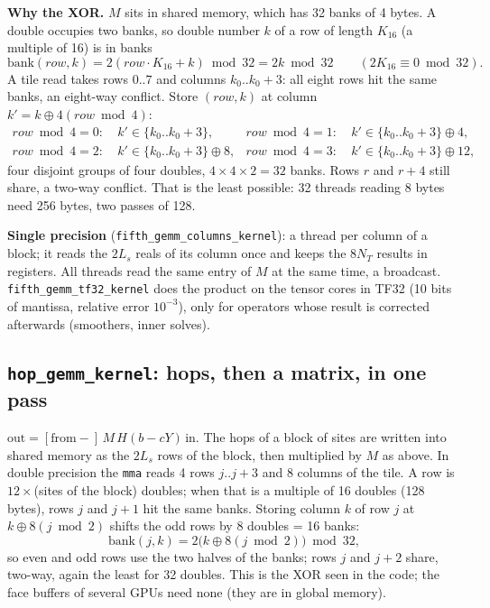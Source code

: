 \documentclass[11pt,a4paper]{article}
\numberwithin{equation}{section}
\newcommand{\code}[1]{\texttt{\small #1}}
\begin{document}
\textbf{Why the XOR.} $M$ sits in shared memory, which has 32 banks of 4 bytes. A double occupies
two banks, so double number $k$ of a row of length $K_{16}$ (a multiple of 16) is in banks
\begin{equation}
\text{bank}(row,k) = 2(row\cdot K_{16}+k) \bmod 32 = 2k \bmod 32\qquad(2K_{16}\equiv0\bmod 32).
\end{equation}
A tile read takes rows $0..7$ and columns $k_0..k_0+3$: all eight rows hit the same banks, an
eight-way conflict. Store $(row,k)$ at column $k' = k \oplus 4(row\bmod4)$:
\begin{align}
row\bmod4=0:&\ k'\in\{k_0..k_0+3\}, & row\bmod4=1:&\ k'\in\{k_0..k_0+3\}\oplus4,\\
row\bmod4=2:&\ k'\in\{k_0..k_0+3\}\oplus8, & row\bmod4=3:&\ k'\in\{k_0..k_0+3\}\oplus12,
\end{align}
four disjoint groups of four doubles, $4\times4\times2=32$ banks. Rows $r$ and $r+4$ still share,
a two-way conflict. That is the least possible: 32 threads reading 8 bytes need 256 bytes, two
passes of 128.

\textbf{Single precision} (\code{fifth\_gemm\_columns\_kernel}): a thread per column of a block;
it reads the $2L_s$ reals of its column once and keeps the $8N_T$ results in registers. All
threads read the same entry of $M$ at the same time, a broadcast. \code{fifth\_gemm\_tf32\_kernel}
does the product on the tensor cores in TF32 (10 bits of mantissa, relative error $10^{-3}$), only
for operators whose result is corrected afterwards (smoothers, inner solves).

\subsection{\code{hop\_gemm\_kernel}: hops, then a matrix, in one pass}

$\text{out} = [\text{from}-]\,M\,H(b-cY)\,\text{in}$. The hops of a block of sites are written into
shared memory as the $2L_s$ rows of the block, then multiplied by $M$ as above. In double
precision the \code{mma} reads 4 rows $j..j+3$ and 8 columns of the tile. A row is $12\times$(sites
of the block) doubles; when that is a multiple of 16 doubles (128 bytes), rows $j$ and $j+1$ hit the
same banks. Storing column $k$ of row $j$ at
$k\oplus8(j\bmod2)$ shifts the odd rows by 8 doubles = 16 banks:
\begin{equation}
\text{bank}(j,k) = 2\big(k\oplus8(j\bmod2)\big)\bmod 32,
\end{equation}
so even and odd rows use the two halves of the banks; rows $j$ and $j+2$ share, two-way, again the
least for 32 doubles. This is the XOR seen in the code; the face buffers of several GPUs need none
(they are in global memory).
\end{document}
